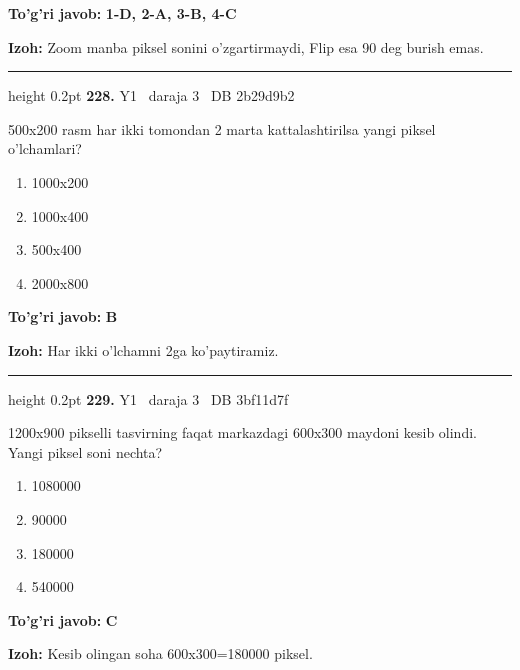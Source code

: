 \documentclass[10pt,a4paper,oneside]{article}
\begin{document}
\begin{tcolorbox}[enhanced,breakable,colback=teal!4,colframe=teal!45!black,boxrule=0.45pt,arc=1.2mm,left=2.8mm,right=2.8mm,top=2mm,bottom=2mm,before skip=2mm,after skip=2mm]
\textbf{\color{teal}To'g'ri javob:} \textbf{1-D, 2-A, 3-B, 4-C}
\par\smallskip
\textbf{Izoh:} Zoom manba piksel sonini o'zgartirmaydi, Flip esa 90 deg  burish emas.
\end{tcolorbox}
\vspace{2mm}\hrule height 0.2pt \vspace{4mm}
\hypertarget{q228}{\textbf{\color{ink}228.}}  {\color{muted}\scriptsize Y1 \textbullet\ daraja 3 \textbullet\ DB 2b29d9b2}
\par
500x200 rasm har ikki tomondan 2 marta kattalashtirilsa yangi piksel o'lchamlari?
\begin{enumerate}[label=\Alph*),leftmargin=9mm]
\item 1000x200
\item 1000x400
\item 500x400
\item 2000x800
\end{enumerate}
\begin{tcolorbox}[enhanced,breakable,colback=teal!4,colframe=teal!45!black,boxrule=0.45pt,arc=1.2mm,left=2.8mm,right=2.8mm,top=2mm,bottom=2mm,before skip=2mm,after skip=2mm]
\textbf{\color{teal}To'g'ri javob:} \textbf{B}
\par\smallskip
\textbf{Izoh:} Har ikki o'lchamni 2ga ko'paytiramiz.
\end{tcolorbox}
\vspace{2mm}\hrule height 0.2pt \vspace{4mm}
\hypertarget{q229}{\textbf{\color{ink}229.}}  {\color{muted}\scriptsize Y1 \textbullet\ daraja 3 \textbullet\ DB 3bf11d7f}
\par
1200x900 pikselli tasvirning faqat markazdagi 600x300 maydoni kesib olindi. Yangi piksel soni nechta?
\begin{enumerate}[label=\Alph*),leftmargin=9mm]
\item 1080000
\item 90000
\item 180000
\item 540000
\end{enumerate}
\begin{tcolorbox}[enhanced,breakable,colback=teal!4,colframe=teal!45!black,boxrule=0.45pt,arc=1.2mm,left=2.8mm,right=2.8mm,top=2mm,bottom=2mm,before skip=2mm,after skip=2mm]
\textbf{\color{teal}To'g'ri javob:} \textbf{C}
\par\smallskip
\textbf{Izoh:} Kesib olingan soha 600x300=180000 piksel.
\end{tcolorbox}
\end{document}
